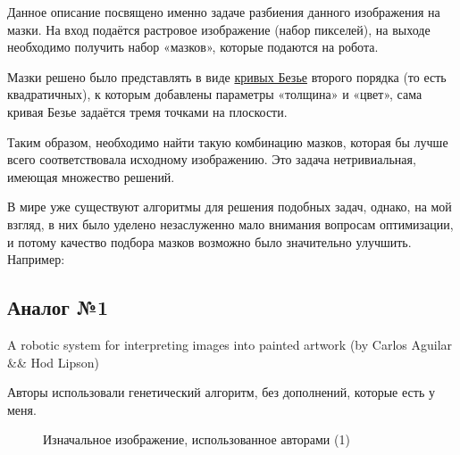 \documentclass[11pt]{article}
\begin{document}
    Данное описание посвящено именно задаче разбиения данного изображения на мазки.
    На вход подаётся растровое изображение (набор пикселей),
    на выходе необходимо получить набор «мазков», которые подаются на робота.

    Мазки решено было представлять в виде \href{https://en.wikipedia.org/wiki/B\%C3\%A9zier_curve}{кривых Безье}
    второго порядка (то есть квадратичных),
    к которым добавлены параметры «толщина» и «цвет», сама кривая Безье задаётся тремя точками на плоскости.

    Таким образом, необходимо найти такую комбинацию мазков, которая бы лучше всего соответствовала исходному изображению.
    Это задача нетривиальная, имеющая множество решений.

    В мире уже существуют алгоритмы для решения подобных задач, однако, на мой взгляд,
    в них было уделено незаслуженно мало внимания вопросам оптимизации,
    и потому качество подбора мазков возможно было значительно улучшить.
    Например:

%
%
%

    \subsection{Аналог №1}\label{subsec:analog-1}
    A robotic system for interpreting images into painted artwork (by Carlos Aguilar \&\& Hod Lipson)

    Авторы использовали генетический алгоритм, без дополнений, которые есть у меня.

    \begin{figure}[h!]
        \centering
        \caption{Изначальное изображение, использованное авторами (1)}
        \label{fig:initial_hod}
    \end{figure}
\end{document}
